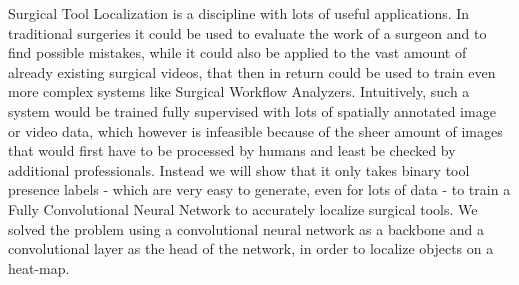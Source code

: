 Surgical Tool Localization is a discipline with lots of useful applications. In traditional surgeries it could be used to evaluate the work of a surgeon and to find possible mistakes, while it could also be applied to the vast amount of already existing surgical videos, that then in return could be used to train even more complex systems like Surgical Workflow Analyzers. Intuitively, such a system would be trained fully supervised with lots of spatially annotated image or video data, which however is infeasible because of the sheer amount of images that would first have to be processed by humans and least be checked by additional professionals. Instead we will show that it only takes binary tool presence labels - which are very easy to generate, even for lots of data - to train a Fully Convolutional Neural Network to accurately localize surgical tools. We solved the problem using a convolutional neural network as a backbone and a convolutional layer as the head of the network, in order to localize objects on a heat-map.